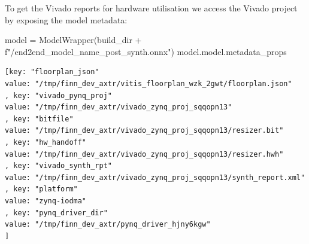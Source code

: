 \documentclass[11pt]{article}
\begin{document}
To get the Vivado reports for hardware utilisation we access the Vivado project by exposing the model metadata:
\begin{jupytercell}
model = ModelWrapper(build_dir + f"/end2end_{model_name}_post_synth.onnx")
model.model.metadata_props
\end{jupytercell}

\begin{verbatim}
[key: "floorplan_json"
value: "/tmp/finn_dev_axtr/vitis_floorplan_wzk_2gwt/floorplan.json"
, key: "vivado_pynq_proj"
value: "/tmp/finn_dev_axtr/vivado_zynq_proj_sqqopn13"
, key: "bitfile"
value: "/tmp/finn_dev_axtr/vivado_zynq_proj_sqqopn13/resizer.bit"
, key: "hw_handoff"
value: "/tmp/finn_dev_axtr/vivado_zynq_proj_sqqopn13/resizer.hwh"
, key: "vivado_synth_rpt"
value: "/tmp/finn_dev_axtr/vivado_zynq_proj_sqqopn13/synth_report.xml"
, key: "platform"
value: "zynq-iodma"
, key: "pynq_driver_dir"
value: "/tmp/finn_dev_axtr/pynq_driver_hjny6kgw"
]
\end{verbatim}
\end{document}
